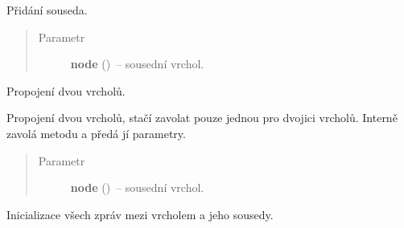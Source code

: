 \begin{fulllineitems}
\begin{fulllineitems}
\end{fulllineitems}


\begin{fulllineitems}
\label{alex.infer:alex.infer.factor.alex.infer.node.DirichletParameterNode.add_neighbor}
Přidání souseda.
\begin{quote}\begin{description}
\item[{Parametr}] \leavevmode
\textbf{node} ({\hyperref[alex.infer:alex.infer.factor.alex.infer.node.DirichletFactorNode]{}})~-- sousední vrchol.

\end{description}\end{quote}

\end{fulllineitems}


\begin{fulllineitems}
\label{alex.infer:alex.infer.factor.alex.infer.node.DirichletParameterNode.connect}
Propojení dvou vrcholů.

Propojení dvou vrcholů, stačí zavolat pouze jednou pro dvojici vrcholů.
Interně zavolá metodu {\hyperref[alex.infer:alex.infer.factor.alex.infer.node.DirichletParameterNode.add_neighbor]{}} a předá jí parametry.
\begin{quote}\begin{description}
\item[{Parametr}] \leavevmode
\textbf{node} ({\hyperref[alex.infer:alex.infer.factor.alex.infer.node.DirichletFactorNode]{}})~-- sousední vrchol.

\end{description}\end{quote}

\end{fulllineitems}


\begin{fulllineitems}
\label{alex.infer:alex.infer.factor.alex.infer.node.DirichletParameterNode.init_messages}
Inicializace všech zpráv mezi vrcholem a jeho sousedy.


\end{fulllineitems}
\end{fulllineitems}
